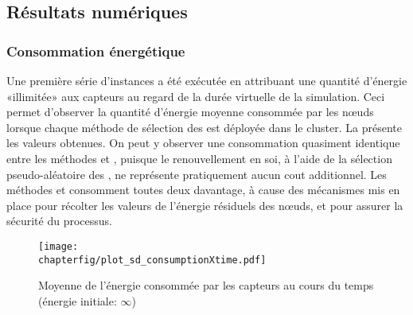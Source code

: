 

\pagebreak %

    \subsection{Résultats numériques}

        \subsubsection{Consommation énergétique}

Une première série d'instances a été exécutée en attribuant une quantité d'énergie «illimitée» aux capteurs au regard de la durée virtuelle de la simulation.
Ceci permet d'observer la quantité d'énergie moyenne consommée par les nœuds lorsque chaque méthode de sélection des \cns est déployée dans le cluster.
La  présente les valeurs obtenues.
On peut y observer une consommation quasiment identique entre les méthodes \idstat et \idrand, puisque le renouvellement en soi, à l'aide de la sélection pseudo-aléatoire des \cns, ne représente pratiquement aucun cout additionnel.
Les méthodes \ideres et \iddemx consomment toutes deux davantage, à cause des mécanismes mis en place pour récolter les valeurs de l'énergie résiduels des nœuds, et pour assurer la sécurité du processus.
\begin{figure}[!hb]
    \centering
    \texttt{[image: \\chapterfig/plot\_sd\_consumptionXtime.pdf]}
    \caption[Moyenne de l'énergie consommée par les capteurs au cours du temps]{Moyenne de l'énergie consommée par les capteurs au cours du temps (énergie initiale: $\infty$)}\label{sd:fig:cons-inf}
\end{figure}

